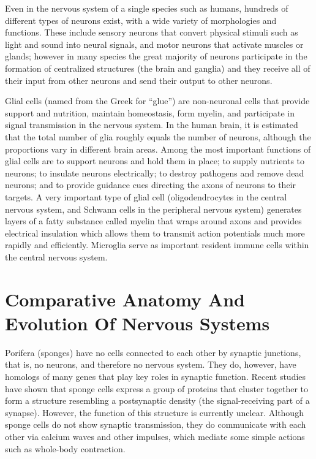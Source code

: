 Even in the nervous system of a single species such as humans, hundreds of different types of neurons exist, with a wide variety of morphologies and functions. These include sensory neurons that convert physical stimuli such as light and sound into neural signals, and motor neurons that activate muscles or glands; however in many species the great majority of neurons participate in the formation of centralized structures (the brain and ganglia) and they receive all of their input from other neurons and send their output to other neurons.

Glial cells (named from the Greek for ``glue'') are non-neuronal cells that provide support and nutrition, maintain homeostasis, form myelin, and participate in signal transmission in the nervous system. In the human brain, it is estimated that the total number of glia roughly equals the number of neurons, although the proportions vary in different brain areas. Among the most important functions of glial cells are to support neurons and hold them in place; to supply nutrients to neurons; to insulate neurons electrically; to destroy pathogens and remove dead neurons; and to provide guidance cues directing the axons of neurons to their targets. A very important type of glial cell (oligodendrocytes in the central nervous system, and Schwann cells in the peripheral nervous system) generates layers of a fatty substance called myelin that wraps around axons and provides electrical insulation which allows them to transmit action potentials much more rapidly and efficiently. Microglia serve as important resident immune cells within the central nervous system.

\hypertarget{comparative-anatomy-and-evolution-of-nervous-systems}{%
\section{Comparative Anatomy And Evolution Of Nervous Systems}\label{comparative-anatomy-and-evolution-of-nervous-systems}}

Porifera (sponges) have no cells connected to each other by synaptic junctions, that is, no neurons, and therefore no nervous system. They do, however, have homologs of many genes that play key roles in synaptic function. Recent studies have shown that sponge cells express a group of proteins that cluster together to form a structure resembling a postsynaptic density (the signal-receiving part of a synapse). However, the function of this structure is currently unclear. Although sponge cells do not show synaptic transmission, they do communicate with each other via calcium waves and other impulses, which mediate some simple actions such as whole-body contraction.

